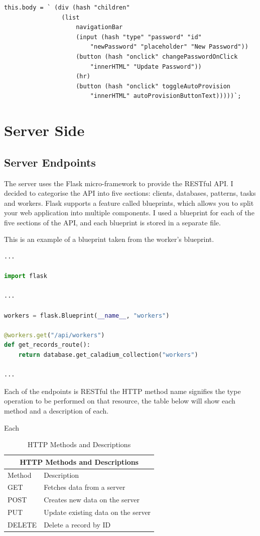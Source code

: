 \begin{lstlisting}
this.body = ` (div (hash "children"
                (list
                    navigationBar
                    (input (hash "type" "password" "id"
                        "newPassword" "placeholder" "New Password"))
                    (button (hash "onclick" changePasswordOnClick
                        "innerHTML" "Update Password"))
                    (hr)
                    (button (hash "onclick" toggleAutoProvision
                        "innerHTML" autoProvisionButtonText)))))`;
\end{lstlisting}

\section{Server Side}

\subsection{Server Endpoints}
The server uses the Flask micro-framework to provide the RESTful API.
I decided to categorise the API into five sections:
clients, databases, patterns, tasks and workers.
Flask supports a feature called blueprints,
which allows you to split your web application into multiple components.
I used a blueprint for each of the five sections of the API,
and each blueprint is stored in a separate file.

This is an example of a blueprint taken from the worker's blueprint.
\begin{lstlisting}[language=python]
...

import flask

...

workers = flask.Blueprint(__name__, "workers")

@workers.get("/api/workers")
def get_records_route():
    return database.get_caladium_collection("workers")

...
\end{lstlisting}

Each of the endpoints is RESTful the HTTP method name signifies the type operation to be performed on that resource, the table below will show each method and a description of each.

Each

\begin{table}
    \centering
    \begin{tabular}{|p{2cm}|p{6cm}|}
        \hline
        \multicolumn{2}{|c|}{HTTP Methods and Descriptions} \\
        \hline
        Method & Description \\
        \hline
        GET & Fetches data from a server \\
        \hline
        POST & Creates new data on the server \\
        \hline
        PUT & Update existing data on the server \\
        \hline
        DELETE & Delete a record by ID \\
        \hline
    \end{tabular}
    \caption{HTTP Methods and Descriptions}
    \label{table:httpMethods}
\end{table}

